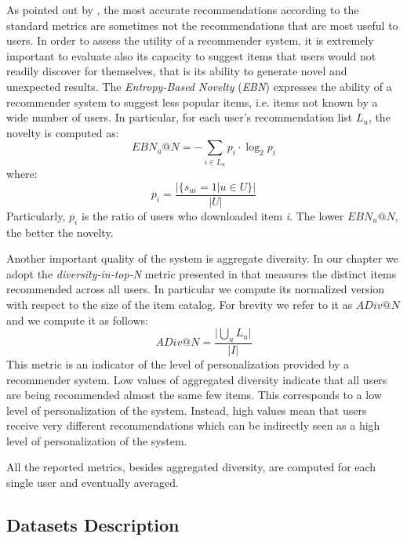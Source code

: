 As pointed out by \cite{McNee2006}, the most accurate recommendations according to the standard metrics are sometimes not the recommendations that are most useful to users. In order to assess the utility of a recommender system, it is extremely important to evaluate also its capacity to suggest items that users would not readily discover for themselves, that is its ability to generate novel and unexpected results.
The \textit{Entropy-Based Novelty} (\textit{EBN}) \cite{Bellogin2010} expresses the ability of a recommender system to suggest less popular items, i.e. items not known by a wide number of users. 
In particular, for each user's recommendation list $L_u$, the novelty is computed as:  
\[ EBN_u@N = - \sum \limits_{ i\in L_u} p_i \cdot \log_{2} p_i \]
where:
\[    p_i = \frac{ \vert \lbrace s_{ui}=1 \vert u \in U \rbrace \vert}{  \vert  U  \vert } \]
\noindent Particularly, $p_i$ is the ratio of users who downloaded item \textit{i}. The lower $EBN_u@N$, the better the novelty.

Another important quality of the system is aggregate diversity. 
In our chapter we adopt the \textit{diversity-in-top-N} metric presented in \cite{AdomaviciusK12} that measures the distinct items recommended across all users. In particular we compute its normalized version with respect to the size of the item catalog. For brevity we refer to it as $ADiv@N$ and we compute it as follows:
\[ ADiv@N = \frac{ \vert \bigcup_u L_u \vert }{ \vert I \vert }  \]
This metric is an indicator of the level of personalization provided by a recommender system. Low values of aggregated diversity indicate  that all users are being recommended almost the same few items. This corresponds to a low level of personalization of the system. Instead, high values mean that users receive very different recommendations which can be indirectly seen as a high level of personalization of the system. %

All the reported metrics, besides aggregated diversity, are computed for each single user and eventually averaged.

\subsection{Datasets Description}
